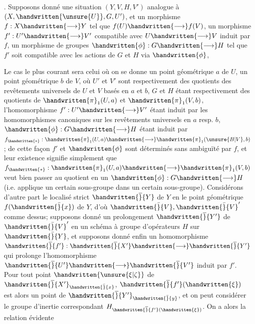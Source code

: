 
. Supposons donné une situation $(Y,V,H,V')$ analogue à $(X,\handwritten{\unsure{U}},G,U')$, et un morphisme $f:X\handwritten{\longrightarrow}Y$ tel que $f(U)\handwritten{\longrightarrow}f(V)$, un morphisme $f':U'\handwritten{\longrightarrow}V'$ compatible avec $U\handwritten{\longrightarrow}V$ induit par $f$, un morphisme de groupes $\handwritten{\phi}:G\handwritten{\longrightarrow}H$ tel que  $f'$ soit compatible avec les actions de $G$ et $H$ via $\handwritten{\phi}$, 

Le cas le plus courant sera celui où on se donne un point géométrique $a$ de $U$,  un point géométrique $b$  de $V$, où $U'$ et $V'$ sont respectivement des quotients des revêtements universels de $U$ et $V$ basés en $a$ et $b$, $G$ et $H$ étant respectivement des quotients de $\handwritten{\pi}_{1}(U,a)$ et $\handwritten{\pi}_{1}(V,b)$, l'homomorphisme $f':U'\handwritten{\longrightarrow}V'$ étant induit par les homomorphismes canoniques sur les revêtements universels en $a$ resp. $b$,   $\handwritten{\phi}:G\handwritten{\longrightarrow}H$ étant induit par $f_{\handwritten{*}}:\handwritten{\pi}_{1}(U,a)\handwritten{\longrightarrow}\handwritten{\pi}_{1}(\unsure{B|V},b)$ ; de cette façon $f'$ et $\handwritten{\phi}$ sont déterminés sans ambiguïté par $f$, et leur existence signifie simplement que $f_{\handwritten{*}}:\handwritten{\pi}_{1}(U,a)\handwritten{\longrightarrow}\handwritten{\pi}_{1}(V,b)$ veut bien passer au quotient en un $\handwritten{\phi}:G\handwritten{\longrightarrow}H$ (i.e. applique un certain sous-groupe dans un certain sous-groupe). Considérons d'autre part le localisé strict $\handwritten{\overline}{Y}$ de $Y$ en le point géométrique $f(\handwritten{\bar}{x})$ de $Y$, d'où  $\handwritten{\bar}{V},\handwritten{\bar}{V}'$ comme dessus; supposons donné un prolongement $\handwritten{\overline}{Y'}$ de $\handwritten{\bar}{V}'$ en un schéma à groupe d'opérateurs $H$ sur $\handwritten{\bar}{Y}$, et supposons donné enfin un homomorphisme $\handwritten{\overline}{f'}:\handwritten{\overline}{X'}\handwritten{\longrightarrow}\handwritten{\overline}{Y'}$ qui prolonge l'homomorphisme  $\handwritten{\overline}{U'}\handwritten{\longrightarrow}\handwritten{\overline}{V'}$ induit par $f'$. Pour tout point $\handwritten{\unsure{\xi|\zeta}}$ de $\handwritten{\overline}{X'}_{\handwritten{\bar}{x}}$, $\handwritten{\overline}{f'}(\handwritten{\xi})$ est alors un point de $\handwritten{\overline}{Y'}_{\handwritten{\bar}{y}}$, et on peut considérer le groupe d'inertie correspondant $H_{\handwritten{\overline}{f'}(\handwritten{\xi})}$. On a alors la relation évidente
